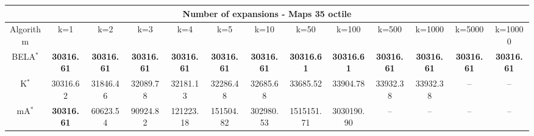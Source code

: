 \begin{tabular}{c|cccccccccccc}\toprule
\multicolumn{13}{c}{Number of expansions - Maps 35 octile}\\ \midrule
Algorithm & k=1 & k=2 & k=3 & k=4 & k=5 & k=10 & k=50 & k=100 & k=500 & k=1000 & k=5000 & k=10000 \\ \midrule
BELA$^*$ & \textbf{30316.61} & \textbf{30316.61} & \textbf{30316.61} & \textbf{30316.61} & \textbf{30316.61} & \textbf{30316.61} & \textbf{30316.61} & \textbf{30316.61} & \textbf{30316.61} & \textbf{30316.61} & \textbf{30316.61} & \textbf{30316.61} \\
K$^*$ & 30316.62 & 31846.46 & 32089.78 & 32181.13 & 32286.48 & 32685.68 & 33685.52 & 33904.78 & 33932.38 & 33932.38 & -- & -- \\
mA$^*$ & \textbf{30316.61} & 60623.54 & 90924.82 & 121223.18 & 151504.82 & 302980.53 & 1515151.71 & 3030190.90 & -- & -- & -- & -- \\ \bottomrule 
\end{tabular}
